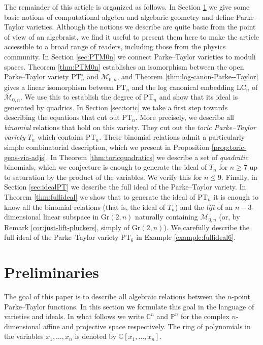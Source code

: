 \documentclass[12pt, reqno]{amsart}
\numberwithin{equation}{section}
\theoremstyle{plain}
\theoremstyle{definition}
\newcommand{\monbar}{\overline{\mathcal{M}}_{0, n}}
\begin{document}
The remainder of this article is organized as follows. In Section \ref{sec:prelim} we give some basic notions of computational algebra and algebaric geometry and define Parke--Taylor varieties.
Although the notions we describe are quite basic from the point of view of an algebraist, we find it useful to present them here to make the article accessible to a broad range of readers, including those from the physics community.
In Section \ref{sec:PTM0n} we connect Parke--Taylor varieties to moduli spaces. Theorem \ref{thm:PTM0n} establishes an isomorphism between the open Parke--Taylor variety $\mathrm{PT}_n^\circ$ and $\mathcal{M}_{0,n}$, and Theorem \ref{thm:log-canon-Parke--Taylor} gives a linear isomorphism between $\mathrm{PT}_n$ and the log canonical embedding $\mathrm{LC}_n$ of $\monbar$. We use this to establish the degree of $\mathrm{PT}_n$ and show that its ideal is generated by quadrics.
In Section \ref{sec:toric} we take a first step towards describing the equations that cut out $\mathrm{PT}_n$. 
More precisely, we describe all \emph{binomial} relations that hold on this variety. 
They cut out the \emph{toric Parke--Taylor variety} $T_n$ which contains $\mathrm{PT}_n$. 
These binomial relations admit a particularly simple combinatorial description, which we present in Proposition \ref{prop:toric-gens-via-adjs}. 
In Theorem \ref{thm:toricquadratics} we describe a set of \emph{quadratic} binomials, which we conjecture is enough to generate the ideal of $T_n$ for $n\geq 7$ up to saturation by the product of the variables. 
We verify this for $n\leq 9$.
Finally, in Section \ref{sec:idealPT} we describe the full ideal of the Parke--Taylor variety. 
In Theorem \ref{thm:fullideal} we show that to generate the ideal of $\mathrm{PT}_n$ it is enough to know all the binomial relations (that is, the ideal of $T_n$) and the \emph{lift} of an $n-3$-dimensional linear subspace in $\mathrm{Gr}(2,n)$ naturally containing $\mathcal{M}_{0,n}$ (or, by Remark \ref{cor:just-lift-pluckers}, simply of $\mathrm{Gr}(2,n)$).
We carefully describe the full ideal of the Parke--Taylor variety $\mathrm{PT}_6$ in Example \ref{example:fullideal6}.

\section{Preliminaries} \label{sec:prelim}

The goal of this paper is to describe all algebraic relations between the $n$-point Parke--Taylor functions. In this section we formulate this goal in the language of varieties and ideals. In what follows we write $\mathbb{C}^n$ and $\mathbb{P}^n$ for the complex $n$-dimensional affine and projective space respectively. The ring of polynomials in the variables $x_1,\ldots,x_n$ is denoted by $\mathbb{C}[x_1,\ldots,x_n]$. 
\end{document}
